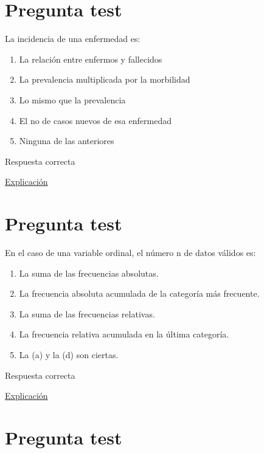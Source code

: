 \documentclass[
]{book}
\providecommand{\tightlist}{%
  \setlength{\itemsep}{0pt}\setlength{\parskip}{0pt}}
\begin{document}
\hypertarget{pregunta-test-7}{%
\section{Pregunta test}\label{pregunta-test-7}}

La incidencia de una enfermedad es:

\begin{enumerate}
\def\labelenumi{\alph{enumi})}
\tightlist
\item
  La relación entre enfermos y fallecidos
\item
  La prevalencia multiplicada por la morbilidad
\item
  Lo mismo que la prevalencia
\item
  El no de casos nuevos de esa enfermedad
\item
  Ninguna de las anteriores
\end{enumerate}

Respuesta correcta

\href{https://medlineplus.gov/spanish/ency/article/002387.htm}{Explicación}

\hypertarget{pregunta-test-8}{%
\section{Pregunta test}\label{pregunta-test-8}}

En el caso de una variable ordinal, el número n de datos válidos es:

\begin{enumerate}
\def\labelenumi{\alph{enumi})}
\tightlist
\item
  La suma de las frecuencias absolutas.
\item
  La frecuencia absoluta acumulada de la categoría más frecuente.
\item
  La suma de las frecuencias relativas.
\item
  La frecuencia relativa acumulada en la última categoría.
\item
  La (a) y la (d) son ciertas.
\end{enumerate}

Respuesta correcta

\href{https://1fjmanzano.github.io/bioestadistica/tablas-de-frecuencias.html}{Explicación}

\hypertarget{pregunta-test-9}{%
\section{Pregunta test}\label{pregunta-test-9}}
\end{document}

